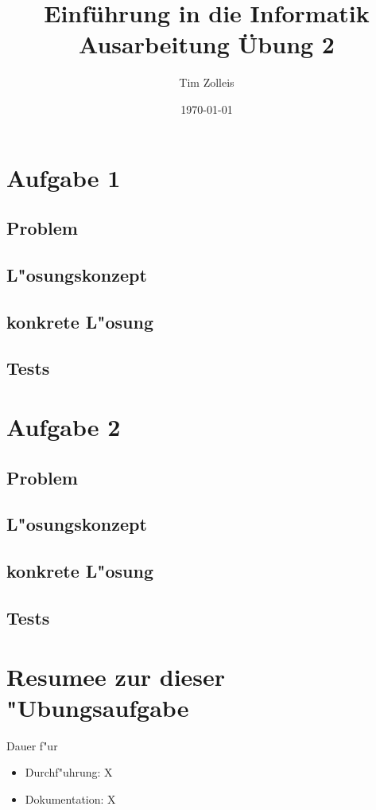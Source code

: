 \documentclass[a4paper,11pt,titlepage]{article}
\begin{document}
    \title{Einf\"uhrung in die Informatik\\
    Ausarbeitung \"Ubung 2}


    \author{Tim Zolleis}

    \date{\today}

    \maketitle{\thispagestyle{plain}}


    \section{Aufgabe 1}

    \subsection{Problem}

    \subsection{L"osungskonzept}

    \subsection{konkrete L"osung}

    \subsection{Tests}


    \section{Aufgabe 2}

    \subsection{Problem}

    \subsection{L"osungskonzept}

    \subsection{konkrete L"osung}

    \subsection{Tests}



    \section{Resumee zur dieser "Ubungsaufgabe}
    Dauer f"ur
    \begin{itemize}
        \item Durchf"uhrung: X
        \item Dokumentation: X
    \end{itemize}

    \begin{thebibliography}{99}
    \end{thebibliography}
\end{document}
